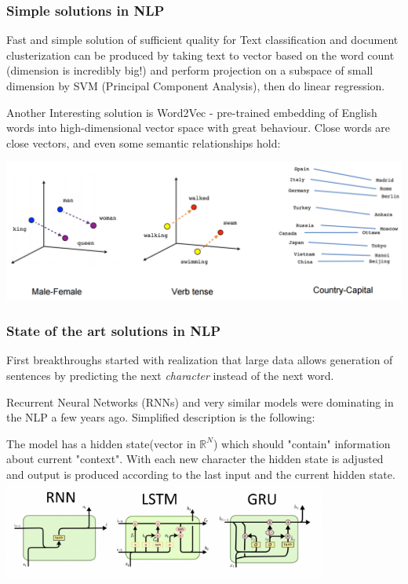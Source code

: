 \documentclass{beamer}
\theoremstyle{remark}
\begin{document}
\begin{frame}
    \frametitle{Simple solutions in NLP}
    Fast and simple solution of sufficient quality for Text classification and document clusterization can be produced by taking text to vector based on the word count (dimension is incredibly big!) and perform projection on a subspace of small dimension by SVM (Principal Component Analysis), then do linear regression.\vspace{0.1in}
    
    Another Interesting solution is Word2Vec - pre-trained embedding of English words into high-dimensional vector space with great behaviour. Close words are close vectors, and even some semantic relationships hold:
    
    \includegraphics[width=\textwidth]{pictures/w2v.png}
\end{frame}

\begin{frame}
    \frametitle{State of the art solutions in NLP}
    First breakthroughs started with realization that large data allows generation of sentences by predicting the next \textit{character} instead of the next word.\vspace{0.1in}
    
    Recurrent Neural Networks (RNNs) and very similar models were dominating in the NLP a few years ago. Simplified description is the following:\vspace{0.1in}
    
    The model has a hidden state(vector in $\mathbb{R}^{N}$) which should "contain" information about current "context". With each new character the hidden state is adjusted and output is produced according to the last input and the current hidden state.
    \includegraphics[width=0.8\textwidth]{pictures/lstm.png}
\end{frame}
\end{document}
